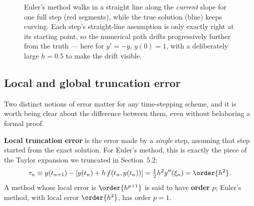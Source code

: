 \begin{figure}[h]
\centering
{}
\caption{Euler's method walks in a straight line along the \emph{current} slope for one full step (red segments), while the true solution (blue) keeps curving. Each step's straight-line assumption is only exactly right at its starting point, so the numerical path drifts progressively further from the truth --- here for $y'=-y$, $y(0)=1$, with a deliberately large $h=0.5$ to make the drift visible.}
\label{fig:euler-staircase}
\end{figure}

\subsection{Local and global truncation error}

Two distinct notions of error matter for any time-stepping scheme, and it is worth being clear about the difference between them, even without belaboring a formal proof.

\textbf{Local truncation error} is the error made by a \emph{single} step, assuming that step started from the exact solution. For Euler's method, this is exactly the piece of the Taylor expansion we truncated in Section~5.2:
\begin{equation}
\tau_n \equiv y(t_{n+1}) - \left[y(t_n) + h\,f(t_n, y(t_n))\right] = \tfrac{1}{2}h^2 y''(\xi_n) = \order{h^2}.
\end{equation}
A method whose local error is $\order{h^{p+1}}$ is said to have \textbf{order} $p$; Euler's method, with local error $\order{h^2}$, has order $p=1$.

